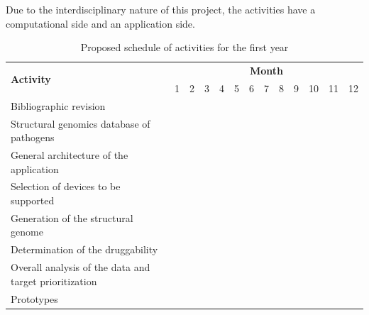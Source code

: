 \documentclass[a4paper,10pt]{article}
\begin{document}
Due to the interdisciplinary nature of this project, the activities have a computational side and an application side.


\begin{table}[ht!]
\centering
\begin{tabular}{|p{8cm}| *{12}{p{0.3cm}|}}
\hline
\multirow{2}{*}{\textbf{Activity}} & \multicolumn{12}{c|}{\textbf{Month}} \\
\cline{2-13}
 & 1 & 2 & 3 & 4 & 5 & 6 & 7 & 8 & 9 & 10 & 11 & 12\\
\hline
Bibliographic revision & \cellcolor[gray]{0.6} & \cellcolor[gray]{0.6} & \cellcolor[gray]{0.6} & & & & & & & & & \\
\hline

Structural genomics database of pathogens & & \cellcolor[gray]{0.6} & \cellcolor[gray]{0.6} & \cellcolor[gray]{0.6} & \cellcolor[gray]{0.6} & \cellcolor[gray]{0.6} & \cellcolor[gray]{0.6} & & & & & \\
\hline

General architecture of the application & & \cellcolor[gray]{0.6} & \cellcolor[gray]{0.6} & \cellcolor[gray]{0.6} & & & & & & & & \\
\hline

Selection of devices to be supported & & & & \cellcolor[gray]{0.6} & \cellcolor[gray]{0.6} & \cellcolor[gray]{0.6} & \cellcolor[gray]{0.6} & & & & & \\
\hline

Generation of the structural genome & & & & & & \cellcolor[gray]{0.6} & \cellcolor[gray]{0.6} & \cellcolor[gray]{0.6} & \cellcolor[gray]{0.6}& & & \\
\hline

Determination of the druggability & & & & & & & & \cellcolor[gray]{0.6}& \cellcolor[gray]{0.6}& & & \\

\hline

Overall analysis of the data and target prioritization & & & & & & & \cellcolor[gray]{0.6} & \cellcolor[gray]{0.6} & \cellcolor[gray]{0.6}& \cellcolor[gray]{0.6}& \cellcolor[gray]{0.6}& \cellcolor[gray]{0.6}\\

\hline

Prototypes & & & & & & \cellcolor[gray]{0.6} & \cellcolor[gray]{0.6} & \cellcolor[gray]{0.6} & \cellcolor[gray]{0.6}& \cellcolor[gray]{0.6}& \cellcolor[gray]{0.6}& \cellcolor[gray]{0.6}\\
\hline
\end{tabular}
\caption{Proposed schedule of activities for the first year}
\label{Tab:Firstyear}
\end{table}
\end{document}
